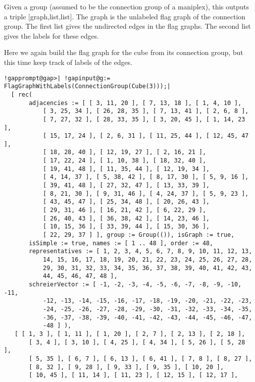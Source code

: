 \documentclass[a4paper,11pt]{report}
\begin{document}
{{{ Given a group (assumed to be the connection group of a maniplex), this outputs
a triple [graph,list,list]. The graph is the unlabeled flag graph of the
connection group. The first list gives the undirected edges in the flag
graphs. The second list gives the labels for these edges. }

 Here we again build the flag graph for the cube from its connection group, but
this time keep track of labels of the edges. 
\begin{Verbatim}[commandchars=!@|,fontsize=\small,frame=single,label=Example]
  !gapprompt@gap>| !gapinput@g:= FlagGraphWithLabels(ConnectionGroup(Cube(3)));|
  [ rec( 
       adjacencies := [ [ 3, 11, 20 ], [ 7, 13, 18 ], [ 1, 4, 10 ], 
           [ 3, 25, 34 ], [ 26, 28, 35 ], [ 7, 13, 41 ], [ 2, 6, 8 ], 
           [ 7, 27, 32 ], [ 28, 33, 35 ], [ 3, 20, 45 ], [ 1, 14, 23 ], 
           [ 15, 17, 24 ], [ 2, 6, 31 ], [ 11, 25, 44 ], [ 12, 45, 47 ], 
           [ 18, 28, 40 ], [ 12, 19, 27 ], [ 2, 16, 21 ], 
           [ 17, 22, 24 ], [ 1, 10, 38 ], [ 18, 32, 40 ], 
           [ 19, 41, 48 ], [ 11, 35, 44 ], [ 12, 19, 34 ], 
           [ 4, 14, 37 ], [ 5, 38, 42 ], [ 8, 17, 30 ], [ 5, 9, 16 ], 
           [ 39, 41, 48 ], [ 27, 32, 47 ], [ 13, 33, 39 ], 
           [ 8, 21, 30 ], [ 9, 31, 46 ], [ 4, 24, 37 ], [ 5, 9, 23 ], 
           [ 43, 45, 47 ], [ 25, 34, 48 ], [ 20, 26, 43 ], 
           [ 29, 31, 46 ], [ 16, 21, 42 ], [ 6, 22, 29 ], 
           [ 26, 40, 43 ], [ 36, 38, 42 ], [ 14, 23, 46 ], 
           [ 10, 15, 36 ], [ 33, 39, 44 ], [ 15, 30, 36 ], 
           [ 22, 29, 37 ] ], group := Group(()), isGraph := true, 
       isSimple := true, names := [ 1 .. 48 ], order := 48, 
       representatives := [ 1, 2, 3, 4, 5, 6, 7, 8, 9, 10, 11, 12, 13, 
           14, 15, 16, 17, 18, 19, 20, 21, 22, 23, 24, 25, 26, 27, 28, 
           29, 30, 31, 32, 33, 34, 35, 36, 37, 38, 39, 40, 41, 42, 43, 
           44, 45, 46, 47, 48 ], 
       schreierVector := [ -1, -2, -3, -4, -5, -6, -7, -8, -9, -10, -11, 
           -12, -13, -14, -15, -16, -17, -18, -19, -20, -21, -22, -23, 
           -24, -25, -26, -27, -28, -29, -30, -31, -32, -33, -34, -35, 
           -36, -37, -38, -39, -40, -41, -42, -43, -44, -45, -46, -47, 
           -48 ] ), 
   [ [ 1, 3 ], [ 1, 11 ], [ 1, 20 ], [ 2, 7 ], [ 2, 13 ], [ 2, 18 ], 
       [ 3, 4 ], [ 3, 10 ], [ 4, 25 ], [ 4, 34 ], [ 5, 26 ], [ 5, 28 ], 
       [ 5, 35 ], [ 6, 7 ], [ 6, 13 ], [ 6, 41 ], [ 7, 8 ], [ 8, 27 ], 
       [ 8, 32 ], [ 9, 28 ], [ 9, 33 ], [ 9, 35 ], [ 10, 20 ], 
       [ 10, 45 ], [ 11, 14 ], [ 11, 23 ], [ 12, 15 ], [ 12, 17 ], 

\end{Verbatim}}}
\end{document}
